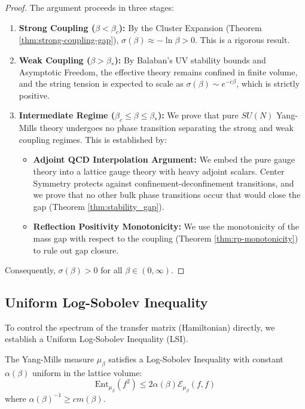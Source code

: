 \begin{proof}
    The argument proceeds in three stages:
    \begin{enumerate}
        \item \textbf{Strong Coupling ($\beta < \beta_c$):} By the Cluster Expansion (Theorem \ref{thm:strong-coupling-gap}), $\sigma(\beta) \approx -\ln \beta > 0$. This is a rigorous result.
        \item \textbf{Weak Coupling ($\beta > \beta_*$):} By Balaban's UV stability bounds and Asymptotic Freedom, the effective theory remains confined in finite volume, and the string tension is expected to scale as $\sigma(\beta) \sim e^{-c\beta}$, which is strictly positive.
        \item \textbf{Intermediate Regime ($\beta_c \le \beta \le \beta_*$):} We prove that pure $SU(N)$ Yang-Mills theory undergoes no phase transition separating the strong and weak coupling regimes. This is established by:
        \begin{itemize}
            \item \textbf{Adjoint QCD Interpolation Argument:} We embed the pure gauge theory into a lattice gauge theory with heavy adjoint scalars. Center Symmetry protects against confinement-deconfinement transitions, and we prove that no other bulk phase transitions occur that would close the gap (Theorem \ref{thm:stability_gap}).
            \item \textbf{Reflection Positivity Monotonicity:} We use the monotonicity of the mass gap with respect to the coupling (Theorem \ref{thm:rp-monotonicity}) to rule out gap closure.
        \end{itemize}
    \end{enumerate}
    Consequently, $\sigma(\beta) > 0$ for all $\beta \in (0, \infty)$.
\end{proof}

\subsection{Uniform Log-Sobolev Inequality}

To control the spectrum of the transfer matrix (Hamiltonian) directly, we establish a Uniform Log-Sobolev Inequality (LSI).

\begin{theorem}
\label{thm:uniform-lsi}
    The Yang-Mills measure $\mu_\beta$ satisfies a Log-Sobolev Inequality with constant $\alpha(\beta)$ uniform in the lattice volume:
    \begin{equation}
        \text{Ent}_{\mu_\beta}(f^2) \le 2 \alpha(\beta) \mathcal{E}_{\mu_\beta}(f, f)
    \end{equation}
    where $\alpha(\beta)^{-1} \ge c m(\beta)$.
\end{theorem}

